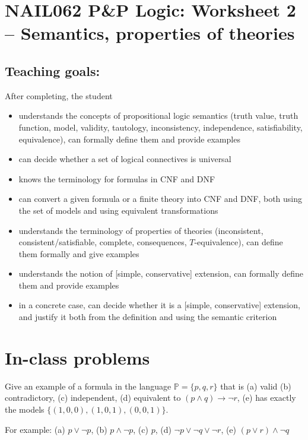\section*{NAIL062 P\&P Logic: Worksheet 2 -- Semantics, properties of theories}

\subsection*{Teaching goals:} After completing, the student

    \begin{itemize}\setlength{\itemsep}{0pt}
        \item understands the concepts of propositional logic semantics (truth value, truth function, model, validity, tautology, inconsistency, independence, satisfiability, equivalence), can formally define them and provide examples
        \item can decide whether a set of logical connectives is universal
        \item knows the terminology for formulas in CNF and DNF %
        \item can convert a given formula or a finite theory into CNF and DNF, both using the set of models and using equivalent transformations
        \item understands the terminology of properties of theories (inconsistent, consistent/satisfiable, complete, consequences, $T$-equivalence), can define them formally and give examples
        \item understands the notion of [simple, conservative] extension, can formally define them and provide examples
        \item in a concrete case, can decide whether it is a [simple, conservative] extension, and justify it both from the definition and using the semantic criterion
    \end{itemize}



\section*{In-class problems}


\begin{problem}

    Give an example of a formula in the language $\mathbb P=\{p,q,r\}$ that is (a) valid (b) contradictory, (c) independent, (d) equivalent to $(p\wedge q)\to\neg r$, (e) has exactly the models $\{(1,0,0),(1,0,1),(0,0,1)\}$.


    \begin{solution}
        For example: (a) $p\lor\neg p$, (b) $p\land\neg p$, (c) $p$, (d) $\neg p\lor\neg q\lor\neg r$, (e) $(p\lor r)\land\neg q$            
    \begin{flushright}\qedsymbol\end{flushright}
    \end{solution}

\end{problem}


